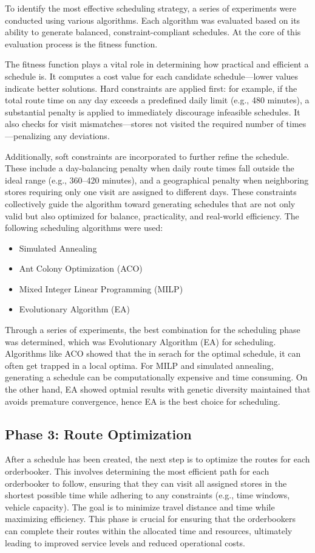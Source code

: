 To identify the most effective scheduling strategy, a series of experiments were conducted using various algorithms. Each algorithm was evaluated based on its ability to generate balanced, constraint-compliant schedules. At the core of this evaluation process is the fitness function.

The fitness function plays a vital role in determining how practical and efficient a schedule is. It computes a cost value for each candidate schedule—lower values indicate better solutions. Hard constraints are applied first: for example, if the total route time on any day exceeds a predefined daily limit (e.g., 480 minutes), a substantial penalty is applied to immediately discourage infeasible schedules. It also checks for visit mismatches—stores not visited the required number of times—penalizing any deviations.

Additionally, soft constraints are incorporated to further refine the schedule. These include a day-balancing penalty when daily route times fall outside the ideal range (e.g., 360–420 minutes), and a geographical penalty when neighboring stores requiring only one visit are assigned to different days. These constraints collectively guide the algorithm toward generating schedules that are not only valid but also optimized for balance, practicality, and real-world efficiency. The following scheduling algorithms were used:

\begin{itemize}
    \item Simulated Annealing
    \item Ant Colony Optimization (ACO)
    \item Mixed Integer Linear Programming (MILP)
    \item Evolutionary Algorithm (EA)
\end{itemize}

Through a series of experiments, the best combination for the scheduling phase was determined, which was Evolutionary Algorithm (EA) for scheduling.
Algorithms like ACO showed that the in serach for the optimal schedule, it can often get trapped in a local optima. For MILP and simulated annealing, 
generating a schedule can be computationally expensive and time consuming. On the other hand, EA showed optmial results with genetic diversity maintained that
avoids premature convergence, hence EA is the best choice for scheduling.

\subsection{Phase 3: Route Optimization}
After a schedule has been created, the next step is to optimize the routes for each orderbooker. This involves determining the most efficient path for each orderbooker to follow, ensuring that they can visit all assigned stores in the shortest possible time while adhering to any constraints (e.g., time windows, vehicle capacity). The goal is to minimize travel distance and time while maximizing efficiency. This phase is crucial for ensuring that the orderbookers can complete their routes within the allocated time and resources, ultimately leading to improved service levels and reduced operational costs.

